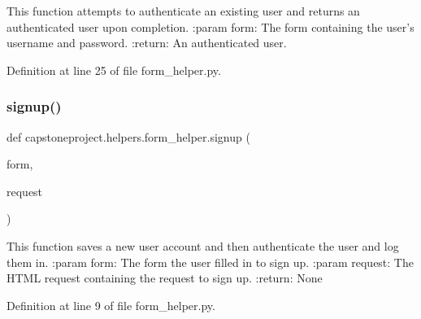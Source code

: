 \begin{DoxyVerb}This function attempts to authenticate an existing user and returns an authenticated user upon completion.
:param form: The form containing the user's username and password.
:return: An authenticated user.
\end{DoxyVerb}
 

Definition at line 25 of file form\+\_\+helper.\+py.

\mbox{\label{namespacecapstoneproject_1_1helpers_1_1form__helper_aa06dc0a0cc29411b56da354a8a844a7b}} 
\subsubsection{\texorpdfstring{signup()}{signup()}}
{\footnotesize\ttfamily def capstoneproject.\+helpers.\+form\+\_\+helper.\+signup (\begin{DoxyParamCaption}\item[{}]{form,  }\item[{}]{request }\end{DoxyParamCaption})}

\begin{DoxyVerb}This function saves a new user account and then authenticate the user and log them in.
:param form: The form the user filled in to sign up.
:param request: The HTML request containing the request to sign up.
:return: None
\end{DoxyVerb}
 

Definition at line 9 of file form\+\_\+helper.\+py.

